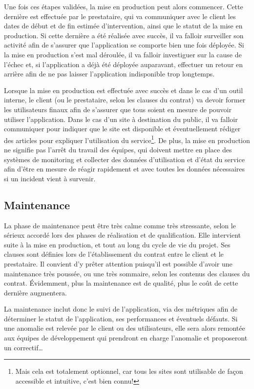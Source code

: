 Une fois ces étapes validées, la mise en production peut alors commencer. Cette dernière est effectuée par le prestataire, qui va communiquer avec le client les dates de début et de fin estimée d'intervention, ainsi que le statut de la mise en production. Si cette dernière a été réalisée avec succès, il va falloir surveiller son activité afin de s'assurer que l'application se comporte bien une fois déployée. Si la mise en production s'est mal déroulée, il va falloir investiguer sur la cause de l'échec et, si l'application a déjà été déployée auparavant, effectuer un retour en arrière afin de ne pas laisser l'application indisponible trop longtemps. 

Lorsque la mise en production est effectuée avec succès et dans le cas d'un outil interne, le client (ou le prestataire, selon les clauses du contrat) va devoir former les utilisateurs finaux afin de s'assurer que tous soient en mesure de pouvoir utiliser l'application. Dans le cas d'un site à destination du public, il va falloir communiquer pour indiquer que le site est disponible et éventuellement rédiger des articles pour expliquer l'utilisation du service\footnote{Mais cela est totalement optionnel, car tous les sites sont utilisable de façon accessible et intuitive, c'est bien connu!}. De plus, la mise en production ne signifie pas l'arrêt du travail des équipes, qui doivent mettre en place des systèmes de monitoring et collecter des données d'utilisation et d'état du service afin d'être en mesure de réagir rapidement et avec toutes les données nécessaires si un incident vient à survenir.

\subsection{Maintenance}

La phase de maintenance peut être très calme comme très stressante, selon le sérieux accordé lors des phases de réalisation et de qualification. Elle intervient suite à la mise en production, et tout au long du cycle de vie du projet. Ses clauses sont définies lors de l'établissement du contrat entre le client et le prestataire. Il convient d'y prêter attention puisqu'il est possible d'avoir une maintenance très poussée, ou une très sommaire, selon les contenus des clauses du contrat. Évidemment, plus la maintenance est de qualité, plus le coût de cette dernière augmentera.

La maintenance inclut donc le suivi de l'application, via des métriques afin de déterminer le statut de l'application, ses performances et éventuels défauts. Si une anomalie est relevée par le client ou des utilisateurs, elle sera alors remontée aux équipes de développement qui prendront en charge l'anomalie et proposeront un correctif\ldots

